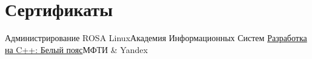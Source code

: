 \section{Сертификаты}\label{sec:certificates}
\resumeSubHeadingListStart
\resumeSmallSubheading
{Администрирование ROSA Linux}{Академия Информационных Систем}
\resumeSmallSubheading
{\href{https://coursera.org/share/cc73c6a33e5a2d6124d6c2842b62343e}{Разработка на C++: Белый пояс}}{МФТИ \& Yandex}
\resumeSubHeadingListEnd